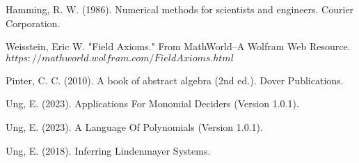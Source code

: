 Hamming, R. W. (1986). Numerical methods for scientists and engineers. Courier Corporation.

Weisstein, Eric W. "Field Axioms." From MathWorld--A Wolfram Web Resource. $https://mathworld.wolfram.com/FieldAxioms.html$

Pinter, C. C. (2010). A book of abstract algebra (2nd ed.). Dover Publications.

Ung, E. (2023). Applications For Monomial Deciders (Version 1.0.1).

Ung, E. (2023). A Language Of Polynomials (Version 1.0.1).

Ung, E. (2018). Inferring Lindenmayer Systems.


